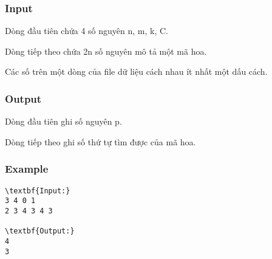 \subsubsection{Input}

Dòng đầu tiên chứa 4 số nguyên n, m, k, C.

Dòng tiếp theo chứa 2n số nguyên mô tả một mã hoa.

Các số trên một dòng của file dữ liệu cách nhau ít nhất một dấu cách.

\subsubsection{Output}

Dòng đầu tiên ghi số nguyên p.

Dòng tiếp theo ghi số thứ tự tìm được của mã hoa.

\subsubsection{Example}
\begin{verbatim}
\textbf{Input:}
3 4 0 1
2 3 4 3 4 3 

\textbf{Output:}
4
3 

\end{verbatim}
